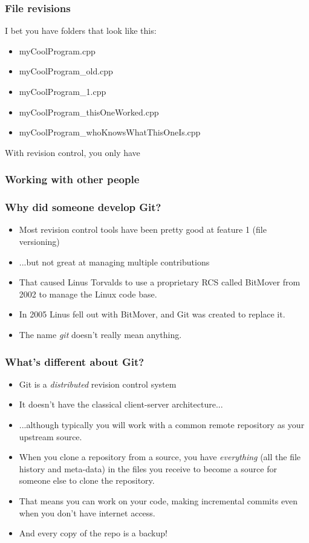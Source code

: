 \documentclass{beamer}
\begin{document}
\begin{frame}
  \frametitle{File revisions}
  I bet you have folders that look like this:
  \pause \begin{itemize}
      \item myCoolProgram.cpp
      \pause \item myCoolProgram\_old.cpp
      \pause \item myCoolProgram\_1.cpp
      \pause \item myCoolProgram\_thisOneWorked.cpp
      \item myCoolProgram\_whoKnowsWhatThisOneIs.cpp
  \end{itemize}
  \pause With revision control, you only have
\end{frame}

\begin{frame}
  \frametitle{Working with other people}
\end{frame}

\begin{frame}
  \frametitle{Why did someone develop Git?}
  \begin{itemize}
    \pause \item Most revision control tools have been pretty good at
    feature 1 (file versioning)
    \pause \item ...but not great at managing multiple contributions
    \pause \item That caused Linus Torvalds to use a proprietary RCS
    called BitMover from 2002 to manage the Linux code base.
    \pause \item In 2005 Linus fell out with BitMover, and Git was
    created to replace it.
    \pause \item The name \emph{git} doesn't really mean anything.
  \end{itemize}
\end{frame}

\begin{frame}
  \frametitle{What's different about Git?}
  \begin{itemize}
  \item Git is a \emph{distributed} revision control system
  \pause \item It doesn't have the classical client-server architecture...
  \pause \item ...although typically you will work with a common
  \alert{remote} repository as your \alert{upstream} source.
  \pause \item When you \alert{clone} a repository from a source, you have
    \emph{everything} (all the file history and meta-data) in the
    files you receive to become a source for someone else to clone the
    repository.
  \pause \item That means you can work on your code, making incremental
  \alert{commits} even when you don't have internet access.
  \pause \item And every copy of the repo is a backup!
  \end{itemize}
\end{frame}
\end{document}
